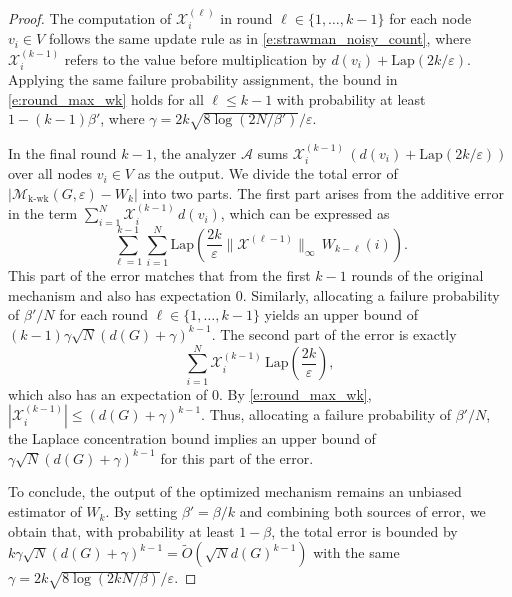 \begin{proof}
The computation of $\mathcal{X}^{(\ell)}_i$ in round $\ell \in \{1, \dots, k{-}1\}$ for each node $v_i \in V$ follows the same update rule as in \eqref{e:strawman_noisy_count}, where $\mathcal{X}^{(k-1)}_i$ refers to the value before multiplication by $d(v_i) + \mathrm{Lap}(2k/\varepsilon)$. 
Applying the same failure probability assignment, the bound in \eqref{e:round_max_wk} holds for all $\ell \leq k{-}1$ with probability at least $1 - (k{-}1)\beta'$, where $\gamma = 2k\sqrt{8\log(2N/\beta')}/\varepsilon$.



In the final round $k-1$, the analyzer $\mathcal{A}$ sums $\mathcal{X}^{(k-1)}_i \, (d(v_i) + \mathrm{Lap}(2k/\varepsilon))$ over all nodes $v_i \in V$ as the output.
We divide the total error of $|\mathcal{M}_{\mathrm{k\text{-}wk}}(G,\varepsilon) - {W}_k|$ into two parts.
The first part arises from the additive error in the term $\sum_{i = 1}^N \mathcal{X}^{(k-1)}_i \, d(v_i)$, which can be expressed as
\begin{equation*}
  \sum_{\ell=1}^{k-1} \sum_{i=1}^N  
  \mathrm{Lap}( 
\frac{2k}{\varepsilon}  \|\mathcal{X}^{(\ell-1)}\|_\infty \,
W_{k-\ell}(i)).
\end{equation*}
This part of the error matches that from the first $k-1$ rounds of the original mechanism and also has expectation $0$.
Similarly, allocating a failure probability of $\beta'/N$ for each round $\ell \in \{1, \dots, k-1\}$ yields an upper bound of $(k-1)\gamma \sqrt{N}(d(G)+\gamma)^{k-1}$.
The second part of the error is exactly 
\begin{equation*}
    \sum_{i=1}^N \mathcal{X}^{(k -1)}_i \, \mathrm{Lap}(\frac{2k}{\varepsilon}),
\end{equation*}
which also has an expectation of $0$.
By \eqref{e:round_max_wk}, $|\mathcal{X}^{(k-1)}_i| \leq (d(G) + \gamma)^{k-1}$. 
Thus, allocating a failure probability of $\beta'/N$, 
the Laplace concentration bound implies an upper bound of $\gamma\sqrt{N}(d(G) + \gamma)^{k-1}$ for this part of the error.


To conclude, the output of the optimized mechanism remains an unbiased estimator of $W_k$. 
By setting $\beta' = \beta/k$ and combining both sources of error, we obtain that, with probability at least $1 - \beta$, the total error is bounded by $k \gamma \sqrt{N} (d(G) + \gamma)^{k-1} = \tilde{O}(\sqrt{N}d(G)^{k-1})$ with the same $\gamma = 2k\sqrt{8\log(2kN/\beta)}/\varepsilon$. \qedhere

\end{proof}

